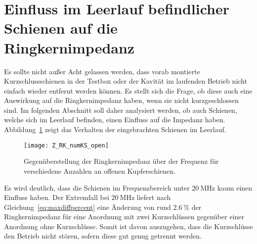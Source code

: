 \section{Einfluss im Leerlauf befindlicher Schienen auf die Ringkernimpedanz}
Es sollte nicht au\ss{}er Acht gelassen werden, dass vorab montierte Kurzschlussschienen in der Testbox oder der Kavit\"at im laufenden Betrieb nicht einfach wieder entfernt werden k\"onnen. Es stellt sich die Frage, ob diese auch eine Auswirkung auf die Ringkernimpedanz haben, wenn sie nicht kurzgeschlossen sind. Im folgenden Abschnitt soll daher analysiert werden, ob auch Schienen, welche sich im Leerlauf befinden, einen Einfluss auf die Impedanz haben. Abbildung~\ref{fig:openksnumber} zeigt das Verhalten der eingebrachten Schienen im Leerlauf.
\begin{figure}[htb]
	\centering
	\texttt{[image: Z\_RK\_numKS\_open]}
	\caption{Gegen\"uberstellung der Ringkernimpedanz \"uber der Frequenz f\"ur verschiedene Anzahlen an offenen Kupferschienen.}
	\label{fig:openksnumber}
\end{figure}
\par
Es wird deutlich, dass die Schienen im Frequenzbereich unter $\SI{20}{\mega\hertz}$ kaum einen Einfluss haben. Der Extremfall bei $\SI{20}{\mega\hertz}$ liefert nach Gleichung~\ref{eq:maxdiffpercent} eine \"Anderung von rund $\SI{2,6}{\%}$ der Ringkernimpedanz f\"ur eine Anordnung mit zwei Kurzschl\"ussen gegen\"uber einer Anordnung ohne Kurzschl\"usse. Somit ist davon auszugehen, dass die Kurzschl\"usse den Betrieb nicht st\"oren, sofern diese gut genug getrennt werden.